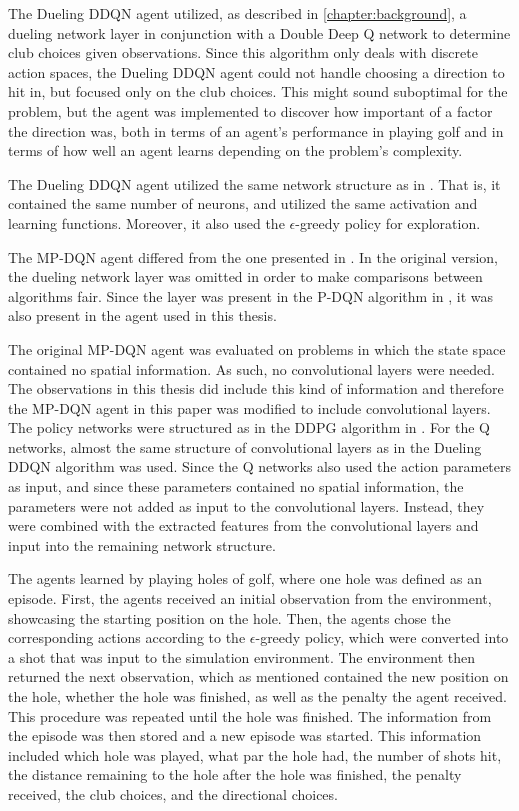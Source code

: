 \documentclass{kththesis}
\begin{document}
The Dueling DDQN agent utilized, as described in \autoref{chapter:background}, a dueling network layer in conjunction with a Double Deep Q network to determine club choices given observations. Since this algorithm only deals with discrete action spaces, the Dueling DDQN agent could not handle choosing a direction to hit in, but focused only on the club choices. This might sound suboptimal for the problem, but the agent was implemented to discover how important of a factor the direction was, both in terms of an agent's performance in playing golf and in terms of how well an agent learns depending on the problem's complexity. 

The Dueling DDQN agent utilized the same network structure as in \textcite{wang2015dueling}. That is, it contained the same number of neurons, and utilized the same activation and learning functions. Moreover, it also used the $\epsilon$-greedy policy for exploration.

The MP-DQN agent differed from the one presented in \textcite{bester2019mpdqn}. In the original version, the dueling network layer was omitted in order to make comparisons between algorithms fair. Since the layer was present in the P-DQN algorithm in \textcite{xiong2018parametrized}, it was also present in the agent used in this thesis. 

The original MP-DQN agent was evaluated on problems in which the state space contained no spatial information. As such, no convolutional layers were needed. The observations in this thesis did include this kind of information and therefore the MP-DQN agent in this paper was modified to include convolutional layers. The policy networks were structured as in the DDPG algorithm in \textcite{lillicrap2015continuous}. For the Q networks, almost the same structure of convolutional layers as in the Dueling DDQN algorithm was used. Since the Q networks also used the action parameters as input, and since these parameters contained no spatial information, the parameters were not added as input to the convolutional layers. Instead, they were combined with the extracted features from the convolutional layers and input into the remaining network structure.

The agents learned by playing holes of golf, where one hole was defined as an episode. First, the agents received an initial observation from the environment, showcasing the starting position on the hole. Then, the agents chose the corresponding actions according to the $\epsilon$-greedy policy, which were converted into a shot that was input to the simulation environment. The environment then returned the next observation, which as mentioned contained the new position on the hole, whether the hole was finished, as well as the penalty the agent received. This procedure was repeated until the hole was finished. The information from the episode was then stored and a new episode was started. This information included which hole was played, what par the hole had, the number of shots hit, the distance remaining to the hole after the hole was finished, the penalty received, the club choices, and the directional choices.
\end{document}
